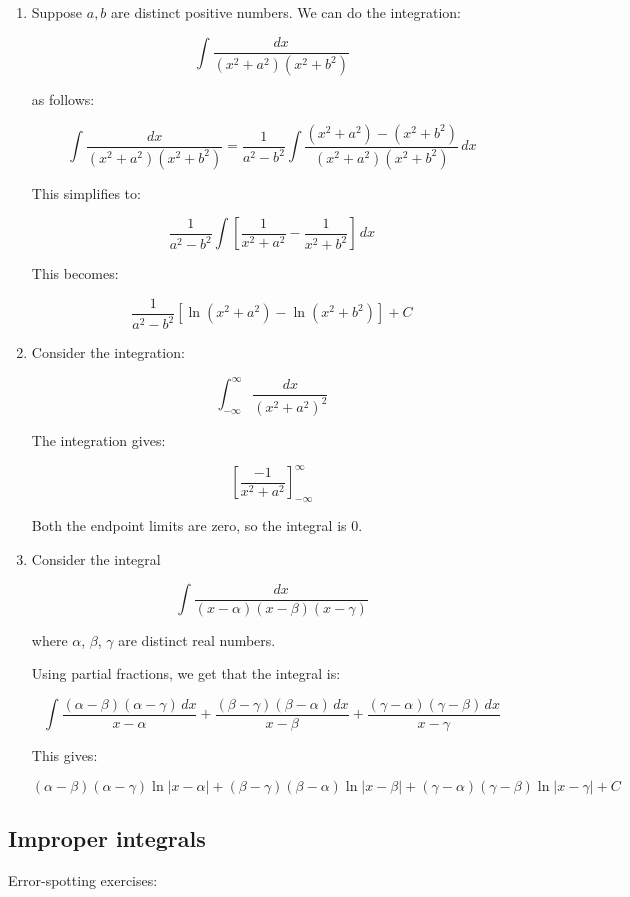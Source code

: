 \documentclass[10pt]{amsart}
\begin{document}
\begin{enumerate}
\item Suppose $a,b$ are distinct positive numbers. We can do the
  integration:

  $$\int \frac{dx}{(x^2 + a^2)(x^2 + b^2)}$$

  as follows:

  $$\int \frac{dx}{(x^2 + a^2)(x^2 + b^2)} = \frac{1}{a^2 - b^2}\int \frac{(x^2 + a^2) - (x^2 + b^2)}{(x^2 + a^2)(x^2 + b^2)}\, dx$$

  This simplifies to:

  $$\frac{1}{a^2 - b^2} \int \left[\frac{1}{x^2 + a^2} - \frac{1}{x^2 + b^2} \right] \, dx$$

  This becomes:

  $$\frac{1}{a^2 - b^2} [\ln(x^2 + a^2) - \ln(x^2 + b^2)] + C$$

\item Consider the integration:

  $$\int_{-\infty}^\infty \frac{dx}{(x^2 + a^2)^2}$$

  The integration gives:

  $$\left[\frac{-1}{x^2 + a^2}\right]_{-\infty}^\infty $$

  Both the endpoint limits are zero, so the integral is $0$.

\item Consider the integral

  $$\int \frac{dx}{(x - \alpha)(x - \beta)(x - \gamma)}$$

  where $\alpha$, $\beta$, $\gamma$ are distinct real numbers.

  Using partial fractions, we get that the integral is:

  $$\int \frac{(\alpha - \beta)(\alpha - \gamma) \, dx}{x - \alpha} + \frac{(\beta - \gamma)(\beta - \alpha) \, dx}{x - \beta} + \frac{(\gamma - \alpha)(\gamma - \beta) \, dx}{x - \gamma}$$

  This gives:

  $$(\alpha - \beta)(\alpha - \gamma)\ln|x - \alpha| + (\beta - \gamma)(\beta - \alpha) \ln|x - \beta| + (\gamma - \alpha)(\gamma - \beta) \ln|x - \gamma| + C$$
\end{enumerate}

\subsection{Improper integrals}

Error-spotting exercises:
\end{document}
